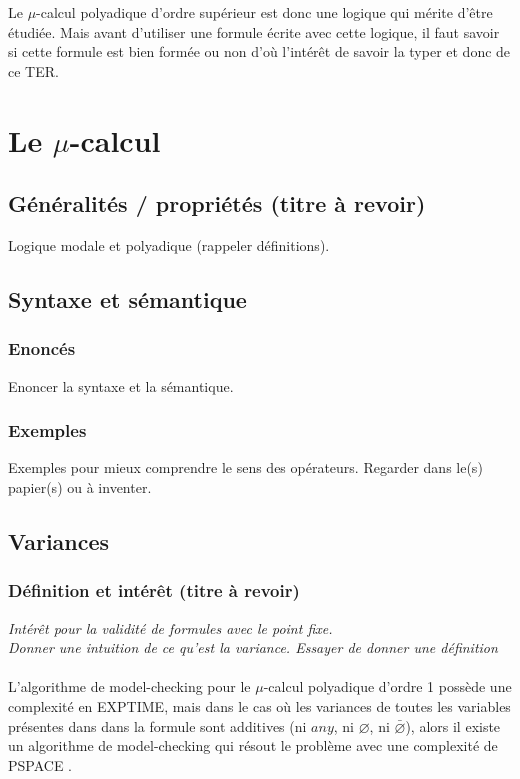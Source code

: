 \documentclass[11pt,a4paper]{article}
\begin{document}
Le $\mu$-calcul polyadique d'ordre supérieur est donc une logique qui mérite d'être étudiée. Mais avant d'utiliser une formule écrite avec cette logique, il faut savoir si cette formule est bien formée ou non d'où l'intérêt de savoir la typer et donc de ce TER. 
\color{black}

\section{Le $\mu$-calcul}

\subsection{Généralités / propriétés (titre à revoir)}

Logique modale et polyadique (rappeler définitions). 

\subsection{Syntaxe et sémantique}

\subsubsection{Enoncés}

Enoncer la syntaxe et la sémantique. 

\subsubsection{Exemples}

Exemples pour mieux comprendre le sens des opérateurs. Regarder dans le(s) papier(s) ou à inventer.

\subsection{Variances}

\subsubsection{Définition et intérêt (titre à revoir)}

\textit{Intérêt pour la validité de formules avec le point fixe. 
\\
Donner une intuition de ce qu'est la variance. Essayer de donner une définition}
\\\\
\color{red}
L'algorithme de model-checking pour le $\mu$-calcul polyadique d'ordre 1 possède une complexité en EXPTIME, mais dans le cas où les variances de toutes les variables présentes dans dans la formule sont additives (ni $any$, ni $\varnothing$, ni $\bar{\varnothing}$), alors il existe un algorithme de model-checking qui résout le problème avec une complexité de PSPACE \cite{lange2014model}.    
\end{document}
